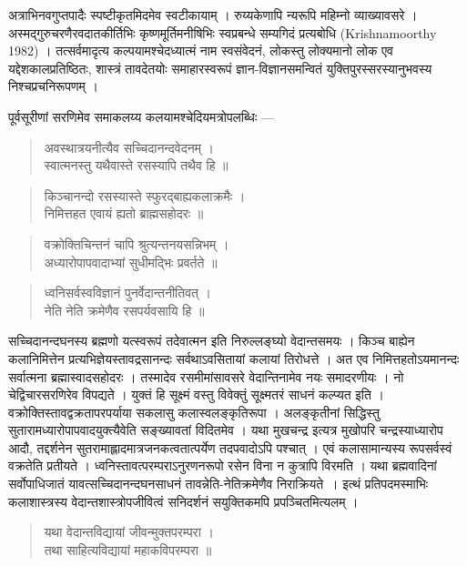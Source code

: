 {\dev अत्राभिनवगुप्तपादैः स्पष्टीकृतमिदमेव स्वटीकायाम् । रुय्यकेणापि न्यरूपि महिम्नो व्याख्यावसरे । अस्मद्गुरुचरणैरवदातकीर्तिभिः कृष्णमूर्तिमनीषिभिः स्वप्रबन्धे सम्यगिदं प्रत्यबोधि} (Krishnamoorthy 1982)  {\dev । तत्सर्वमादृत्य कल्पयामश्चेदध्यात्मं नाम स्वसंवेदनं, लोकस्तु लोक्यमानो लोक एव यद्देशकालप्रतिष्ठितः, शास्त्रं तावदेतयोः समाहारस्वरूपं ज्ञान-विज्ञानसमन्वितं युक्तिपुरस्सरस्यानुभवस्य निश्चप्रचनिरूपणम् ।}   

{\dev पूर्वसूरीणां सरणिमेव समाकलय्य कलयामश्चेदियमत्रोपलब्धिः ---}
\begin{quote}
{\dev अवस्थात्रयनीत्यैव सच्चिदानन्दवेदनम् ।}\\
{\dev स्वात्मनस्तु यथैवास्ते रसस्यापि तथैव हि ॥}
\end{quote}
\begin{quote}
{\dev किञ्चानन्दो रसस्यास्ते स्फुरद्बाह्यकलाक्रमैः ।}\\
{\dev निमित्तहत एवायं ह्यतो ब्राह्मसहोदरः ॥}
\end{quote}
\begin{quote}
{\dev वक्रोक्तिचिन्तनं चापि श्रुत्यन्तनयसन्निभम् ।}\\
{\dev अध्यारोपापवादाभ्यां सुधीमद्भिः प्रवर्तते ॥}
\end{quote}
\begin{quote}
{\dev ध्वनिसर्वस्वविज्ञानं पुनर्वेदान्तनीतिवत् ।}\\
{\dev नेति नेति क्रमेणैव रसपर्यवसायि हि ॥}
\end{quote}

{\dev सच्चिदानन्दघनस्य ब्रह्मणो यत्स्वरूपं तदेवात्मन इति निरुल्लङ्घ्यो वेदान्तसमयः । किञ्च बाह्येन कलानिमित्तेन प्रत्यभिज्ञेयस्तावद्रसानन्दः सर्वथाऽवसितायां कलायां तिरोधत्ते । अत एव निमित्तहतोऽयमानन्दः सर्वात्मना ब्रह्मास्वादसहोदरः । तस्मादेव रसमीमांसावसरे वेदान्तिनामेव नयः समादरणीयः । नो चेद्विचारसरणिरेव विपद्यते । युक्तं हि सूक्ष्मं वस्तु विवेक्तुं सूक्ष्मतरं साधनं कल्प्यत इति । वक्रोक्तिस्तावद्वक्रतापरपर्याया सकलासु कलास्वलङ्कृतिरूपा । अलङ्कृतीनां सिद्धिस्तु सुतारामध्यारोपापवादयुक्त्यैवेति सङ्ख्यावतां विदितमेव । यथा मुखचन्द्र इत्यत्र मुखोपरि चन्द्रस्याध्यारोप आदौ, तद्दर्शनेन सुतरामाह्लादमात्रजनकत्वतात्पर्येण तदपवादोऽपि पश्चात् ।  एवं कलासामान्यस्य रूपसर्वस्वं वक्रतेति प्रतीयते । ध्वनिस्तावत्परम्पराऽनुरणनरूपो रसेन विना न कुत्रापि विरमति । यथा ब्रह्मवादिनां सर्वोपाधिजातं यावत्सच्चिदानन्दघनसाधनं तावन्नेति-नेतिक्रमेणैव निराक्रियते~। इत्थं प्रतिपदमस्माभिः कलाशास्त्रस्य वेदान्तशास्त्रोपजीवित्वं सनिदर्शनं सयुक्तिकमपि प्रपञ्चितमित्यलम् ।}
\begin{quote}
{\dev यथा वेदान्तविद्यायां जीवन्मुक्तपरम्परा ।}\\
{\dev तथा साहित्यविद्यायां महाकविपरम्परा ॥}
\end{quote}

